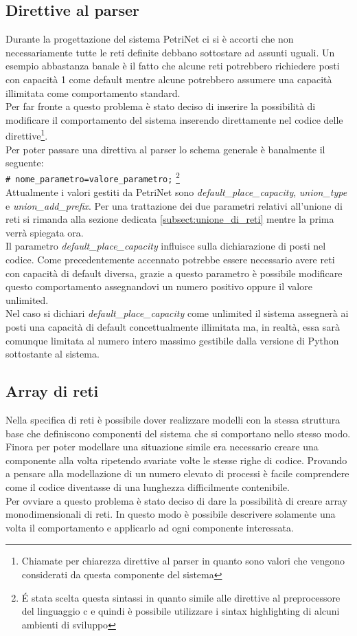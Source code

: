 \documentclass[italian,12pt]{book}
\begin{document}
\subsection{Direttive al parser}\label{subsec:direttive_al_parser}
Durante la progettazione del sistema PetriNet ci si è accorti che non
necessariamente tutte le reti definite debbano sottostare ad assunti
uguali. Un esempio abbastanza banale è il fatto che alcune reti
potrebbero richiedere posti con capacità 1 come default mentre alcune
potrebbero assumere una capacità illimitata come comportamento
standard. \\
Per far fronte a questo problema è stato deciso di inserire la
possibilità di modificare il comportamento del sistema inserendo
direttamente nel codice delle direttive\footnote{Chiamate per
  chiarezza direttive al parser in quanto sono valori che vengono
  considerati da questa componente del sistema}.\\
Per poter passare una direttiva al parser lo schema generale è
banalmente il
seguente: \\
{\tt \# nome\_parametro=valore\_parametro;} \footnote{\'E stata
  scelta questa sintassi in quanto simile alle direttive al
  preprocessore del linguaggio c e quindi è possibile utilizzare i
  sintax highlighting di alcuni ambienti di sviluppo} \\
Attualmente i valori gestiti da PetriNet sono
\emph{default\_place\_capacity}, \emph{union\_type} e
\emph{union\_add\_prefix}. Per una trattazione dei due parametri
relativi all'unione di reti si rimanda alla sezione dedicata
\ref{subsect:unione_di_reti} mentre la prima verrà spiegata ora. \\
Il parametro \emph{default\_place\_capacity} influisce sulla
dichiarazione di posti nel codice. Come precedentemente accennato
potrebbe essere necessario avere reti con capacità di default diversa,
grazie a questo parametro è possibile modificare questo comportamento
assegnandovi un numero positivo oppure il valore unlimited. \\
Nel caso si dichiari \emph{default\_place\_capacity} come unlimited il
sistema assegnerà ai posti una capacità di default concettualmente
illimitata ma, in realtà, essa sarà comunque limitata al numero intero
massimo gestibile dalla versione di Python sottostante al sistema.

\subsection{Array di reti}
Nella specifica di reti è possibile dover realizzare modelli con la stessa struttura base che 
definiscono componenti del sistema che si comportano nello stesso modo. Finora per poter modellare 
una situazione simile era necessario creare una componente alla volta ripetendo svariate volte 
le stesse righe di codice. Provando a pensare alla modellazione di un numero elevato di processi è 
facile comprendere come il codice diventasse di una lunghezza difficilmente contenibile. \\
Per ovviare a questo problema è stato deciso di dare la possibilità di creare array monodimensionali 
di reti. In questo modo è possibile descrivere solamente una volta il comportamento e applicarlo ad 
ogni componente interessata.
\end{document}

